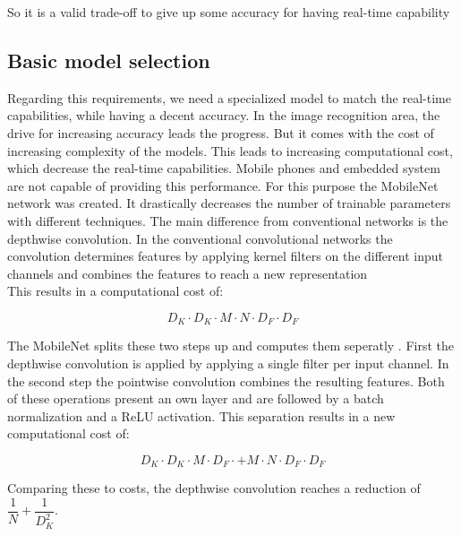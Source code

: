 So it is a valid trade-off to give up some accuracy for having real-time capability

\subsection{Basic model selection}

Regarding this requirements, we need a specialized model to match the real-time capabilities, while having a decent accuracy. In the image recognition area, the drive for increasing accuracy leads the progress. But it comes with the cost of increasing complexity of the models. This leads to increasing computational cost, which decrease the real-time capabilities. Mobile phones and embedded system are not capable of providing this performance. For this purpose the MobileNet \cite{tim1} network was created. It drastically decreases the number of trainable parameters with different techniques. The main difference from conventional networks is the depthwise convolution. In the conventional convolutional networks the convolution determines features by applying kernel filters on the different input channels and combines the features to reach a new representation \cite{tim1}\\

This results in a computational cost of:

$$ D_K \cdot D_K \cdot M \cdot N \cdot D_F \cdot D_F$$

The MobileNet splits these two steps up and computes them seperatly \cite{tim2,tim3}.  First the depthwise convolution is applied by applying a single filter per input channel. In the second step the pointwise convolution combines the resulting features. Both of these operations present an own layer and are followed by a batch normalization and a ReLU activation. This separation results in a new computational cost of:

$$ D_K \cdot D_K \cdot M \cdot D_F \cdot + M \cdot N \cdot D_F \cdot D_F $$

Comparing these to costs, the depthwise convolution reaches a reduction of $ \dfrac{1}{N} + \dfrac{1}{D^2_K} $.

